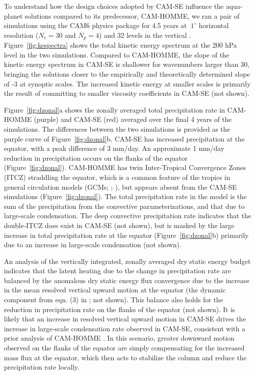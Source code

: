 \documentclass{agujournal}
\begin{document}
To understand how the design choices adopted by CAM-SE influence the aqua-planet solutions compared to its predecessor, CAM-HOMME, we ran a pair of simulations using the CAM6 physics package for 4.5 years at $~1^\circ$ horizontal resolution ($N_e=30$ and $N_p=4$) and 32 levels in the vertical {\color{red}{(model top is at approximately 3.6Pa)}}. Figure~\ref{fig:kespectra} shows the total kinetic energy spectrum at the 200 hPa level in the two simulations. Compared to CAM-HOMME, the slope of the kinetic energy spectrum in CAM-SE is shallower for wavenumbers larger than 30, bringing the solutions closer to the empirically \citep{NG1985JAS} and theoretically \citep{C1971JAS} determined slope of -3 at synoptic scales. The increased kinetic energy at smaller scales is primarily the result of committing to smaller viscosity coefficients in CAM-SE (not shown).

 Figure~\ref{fig:dzonal}a shows the zonally averaged total precipitation rate in CAM-HOMME (purple) and CAM-SE (red) averaged over the final 4 years of the simulations. The differences between the two simulations is provided as the purple curve of Figure~\ref{fig:dzonal}b. CAM-SE has increased precipitation at the equator, with a peak difference of 3 mm/day. An approximate 1 mm/day reduction in precipitation occurs on the flanks of the equator (Figure~\ref{fig:dzonal}). CAM-HOMME has twin Inter-Tropical Convergence Zones (ITCZ) straddling the equator, which is a common feature of the tropics in general circulation models (GCMs; \cite{BGN2010JCLIM}; \cite{MWO2016JAMES}), but appears absent from the CAM-SE simulations (Figure~\ref{fig:dzonal}). The total precipitation rate in the model is the sum of the precipitation from the convective parameterizations, and that due to large-scale condensation. The deep convective precipitation rate indicates that the double-ITCZ does exist in CAM-SE (not shown), but is masked by the large increase in total precipitation rate at the equator (Figure~\ref{fig:dzonal}b) primarily due to an increase in large-scale condensation (not shown).

An analysis of the vertically integrated, zonally averaged dry static energy budget indicates that the latent heating due to the change in precipitation rate are balanced by the anomalous dry static energy flux convergence due to the increase in the mean resolved vertical upward motion at the equator (the dynamic component from eqn. (3) in \cite{MO2011NATUREC}; not shown). This balance also holds for the reduction in precipitation rate on the flanks of the equator (not shown). It is likely that an increase in resolved vertical upward motion in CAM-SE drives the increase in large-scale condensation rate observed in CAM-SE, consistent with a prior analysis of CAM-HOMME \citep{OETAL2016JAMES}. In this scenario, greater downward motion observed on the flanks of the equator are simply compensating for the increased mass flux at the equator, which then acts to stabilize the column and reduce the precipitation rate locally.
\end{document}
